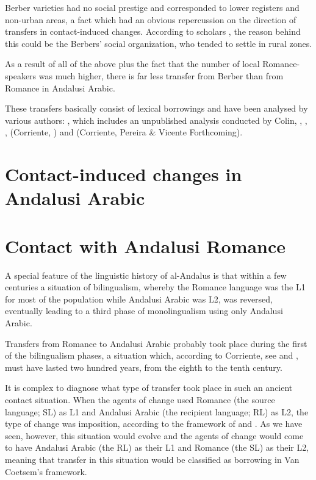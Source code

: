 \documentclass[output=paper,modfonts,nonflat]{langsci/langscibook}
\begin{document}
Berber varieties had no social prestige and corresponded to lower registers and non-urban areas, a fact which had an obvious repercussion on the direction of transfers in contact-induced changes. According to scholars \citep[160]{Chalmeta2003}, \citep{Guichard1995} the reason behind this could be the Berbers’ social organization, who tended to settle in rural zones. 

As a result of all of the above plus the fact that the number of local Romance-speakers was much higher, there is far less transfer from Berber than from Romance in Andalusi Arabic. 

These transfers basically consist of lexical borrowings and have been analysed by various authors: \citep{Ferrando1997}, which includes an unpublished analysis conducted by Colin, \citep{Corriente1981}, \citep{Corriente1998b}, \citep{Corriente2002}, (Corriente, \citealt{PereiraVicente2017}) and (Corriente, Pereira \& Vicente Forthcoming).


\section{Contact-induced changes in Andalusi Arabic} 

 

\section{Contact with Andalusi Romance}



A special feature of the linguistic history of al-Andalus is that within a few centuries a situation of bilingualism, whereby the Romance language was the L1 for most of the population while Andalusi Arabic was L2, was reversed, eventually leading to a third phase of monolingualism using only Andalusi Arabic. 

Transfers from Romance to Andalusi Arabic probably took place during the first of the bilingualism phases, a situation which, according to Corriente, see \citep{Corriente2005} and \citep{Corriente2008}, must have lasted two hundred years, from the eighth to the tenth century. 

It is complex to diagnose what type of transfer took place in such an ancient contact situation. When the agents of change used Romance (the source language; SL) as L1 and Andalusi Arabic (the recipient language; RL) as L2, the type of change was imposition, according to the framework of \citep{Coetsem1988} and \citep{Coetsem2000}. As we have seen, however, this situation would evolve and the agents of change would come to have Andalusi Arabic (the RL) as their L1 and Romance (the SL) as their L2, meaning that transfer in this situation would be classified as borrowing in Van Coetsem’s framework. 
\end{document}
